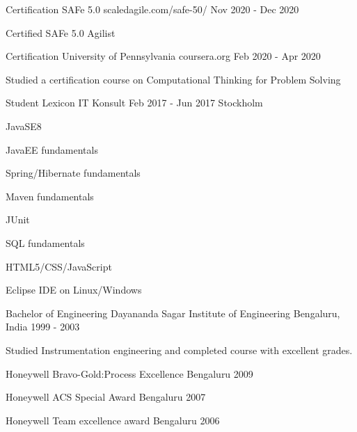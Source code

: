 \documentclass[11pt, a4paper]{awesome-cv}
\begin{document}
  \begin{cventries}
    \cventry
    {Certification}
      {SAFe 5.0}
      {scaledagile.com/safe-50/}
      {Nov 2020 - Dec 2020}
      {
        \begin{cvitems}
        \item {Certified SAFe 5.0 Agilist}
        \end{cvitems}
      }

    \cventry
      {Certification}
      {University of Pennsylvania}
      {coursera.org}
      {Feb 2020 - Apr 2020}
      {
        \begin{cvitems}
        \item {Studied a certification course on Computational Thinking for Problem Solving}
        \end{cvitems}
      }

    \cventry
      {Student}
      {Lexicon IT Konsult}
      {Feb 2017 - Jun 2017}
      {Stockholm}
      {
        \begin{cvitems}
          \item JavaSE8
          \item JavaEE fundamentals
          \item Spring/Hibernate fundamentals
          \item Maven fundamentals
          \item JUnit
          \item SQL fundamentals
          \item HTML5/CSS/JavaScript
          \item Eclipse IDE on Linux/Windows
           \end{cvitems}
      }

    \cventry
      {Bachelor of Engineering}
      {Dayananda Sagar Institute of Engineering}
      {Bengaluru, India}
      {1999 - 2003}
      {
        \begin{cvitems}
        \item {Studied Instrumentation engineering and completed course with excellent grades.}
        \end{cvitems}
      }
  \end{cventries}

  \begin{cvhonors}

      \cvhonor
      {Honeywell}
      {Bravo-Gold:Process Excellence}
      {Bengaluru}
      {2009}

      \cvhonor
      {Honeywell}
      {ACS Special Award}
      {Bengaluru}
      {2007}

      \cvhonor
      {Honeywell}
      {Team excellence award}
      {Bengaluru}
      {2006}
  \end{cvhonors}
\end{document}
